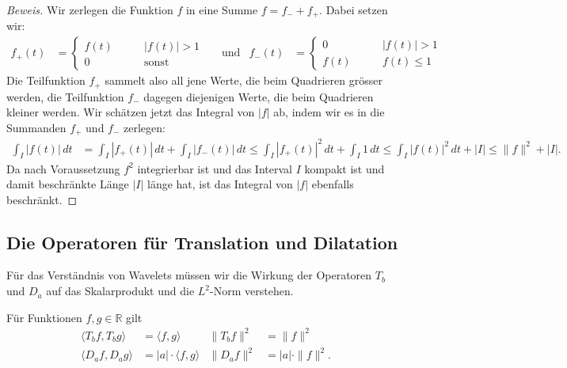 \begin{proof}[Beweis]
Wir zerlegen die Funktion $f$ in eine Summe $f=f_-+f_+$. 
Dabei setzen wir:
\begin{align*}
f_+(t) &= 
\begin{cases}
f(t)&\qquad |f(t)| > 1\\
0   &\qquad\text{sonst}
\end{cases}
&&\text{und}
&
f_-(t)
&=
\begin{cases}
0   &\qquad |f(t)| > 1\\
f(t)&\qquad f(t)\le 1
\end{cases}
\end{align*}
Die Teilfunktion $f_+$ sammelt also all jene Werte, die beim Quadrieren
grösser werden, die Teilfunktion $f_-$ dagegen diejenigen Werte, die
beim Quadrieren kleiner werden.
Wir schätzen jetzt das Integral von $|f|$ ab, indem wir es in die Summanden
$f_+$ und $f_-$ zerlegen:
\begin{align*}
\int_I |f(t)|\,dt
&=
\int_I |f_+(t)|\,dt + \int_I |f_-(t)|\,dt
\le
\int_I |f_+(t)|^2\,dt + \int_I 1\,dt
\le 
\int_I |f(t)|^2\,dt + |I|
\le \|f\|^2 + |I|.
\end{align*}
Da nach Voraussetzung $f^2$ integrierbar ist und das Interval $I$ kompakt ist
und damit beschränkte Länge $|I|$ länge hat, ist das Integral von $|f|$
ebenfalls beschränkt.
\end{proof}

\subsection{Die Operatoren für Translation und Dilatation
\label{subsection:translation-dilatation2}}
Für das Verständnis von Wavelets müssen wir die Wirkung der Operatoren
$T_b$ und $D_a$ auf das Skalarprodukt und die $L^2$-Norm verstehen.

\begin{satz}
Für Funktionen $f,g\in\mathbb R$ gilt
\begin{align}
&\qquad&
\langle T_bf,T_bg\rangle
&=
\langle f,g\rangle
&
\| T_bf\|^2 &= \|f\|^2
&\qquad&
\label{normTb}
\\
&&
\langle D_af,D_ag\rangle
&=
|a|\cdot
\langle f,g\rangle
&
\| D_af\|^2 &= |a|\cdot \|f\|^2.
&&
\label{normDa}
\end{align}
\end{satz}

